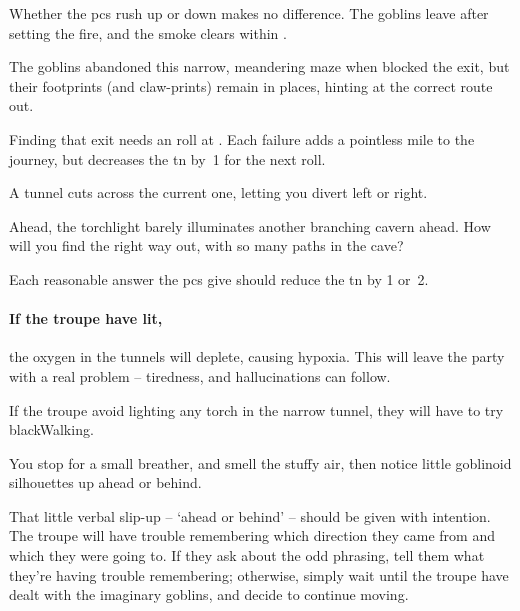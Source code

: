 \begin{multicols}{2}
Whether the \glspl{pc} rush up or down makes no difference.
The goblins leave after setting the fire, and the smoke clears within .



The goblins abandoned this narrow, meandering maze when  blocked the exit, but their footprints (and claw-prints) remain in places, hinting at the correct route out.

Finding that exit needs an  roll at \tn[10].
Each failure adds a pointless mile to the journey, but decreases the \gls{tn} by~1 for the next roll.%

\begin{boxtext}
  A tunnel cuts across the current one, letting you divert left or right.

  Ahead, the torchlight barely illuminates another branching cavern ahead.
  How will you find the right way out, with so many paths in the cave?
\end{boxtext}

Each reasonable answer the \glspl{pc} give should reduce the \gls{tn} by 1 or~2.

\paragraph{If the troupe have  lit,}
the oxygen in the tunnels will deplete, causing \gls{hypoxia}.
This will leave the party with a real problem -- tiredness, and hallucinations can follow.

If the troupe avoid lighting any torch in the narrow tunnel, they will have to try \gls{blackWalking}.%

\begin{boxtext}
  You stop for a small breather, and smell the stuffy air, then notice little goblinoid silhouettes up ahead or behind.
\end{boxtext}

That little verbal slip-up -- `ahead or behind' -- should be given with intention.
The troupe will have trouble remembering which direction they came from and which they were going to.
If they ask about the odd phrasing, tell them what they're having trouble remembering; otherwise, simply wait until the troupe have dealt with the imaginary goblins, and decide to continue moving.


\end{multicols}
